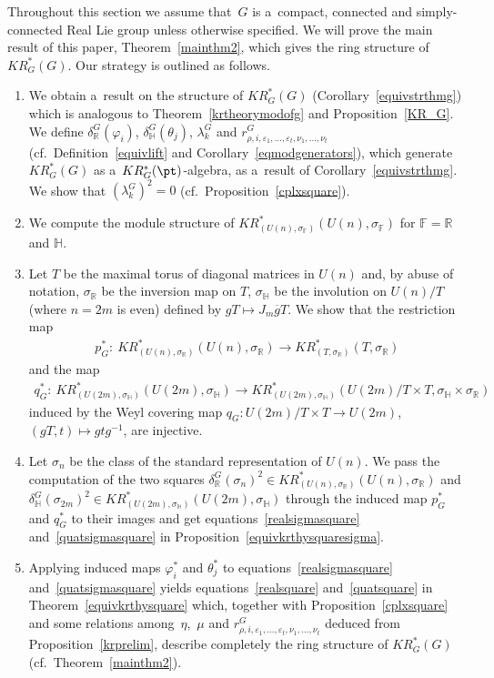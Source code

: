 Throughout this section we assume that~$G$ is a~compact, connected and simply-connected Real Lie group unless otherwise
specif\/ied.
We will prove the main result of this paper, Theorem~\ref{mainthm2}, which gives the ring structure of $KR_G^*(G)$.
Our strategy is outlined as follows.
\begin{enumerate}\itemsep=0pt
\item
We obtain a~result on the structure of $KR^*_G(G)$ (Corollary~\ref{equivstrthmg}) which is analogous to
Theorem~\ref{krtheorymodofg} and Proposition~\ref{KR_G}.
We def\/ine $\delta_\mathbb{R}^G(\varphi_i)$, $\delta_\mathbb{H}^G(\theta_j)$, $\lambda_k^G$ and $r^G_{\rho, i,
\varepsilon_1, \dots, \varepsilon_t, \nu_1, \dots, \nu_t}$ (cf.\ Def\/inition~\ref{equivlift} and
Corollary~\ref{eqmodgenerators}), which generate $KR_G^*(G)$ as a~$KR_G^*(\pt)$-algebra, as a~result of
Corollary~\ref{equivstrthmg}.
We show that $(\lambda_k^G)^2=0$ (cf.\ Proposition~\ref{cplxsquare}).
\item
We compute the module structure of $KR^*_{(U(n),
\sigma_\mathbb{F})}(U(n),
\sigma_\mathbb{F})$ for $\mathbb{F}=\mathbb{R}$ and $\mathbb{H}$.
\item
Let $T$ be the maximal torus of diagonal matrices in $U(n)$ and, by abuse of notation, $\sigma_\mathbb{R}$ be the inversion map on $T$, $\sigma_\mathbb{H}$ be the involution on $U(n)/T$ (where $n=2m$ is even) def\/ined by $gT\mapsto J_m\overline{g}T$.
We show that the restriction map
\begin{gather*}
p^*_G: \  KR^*_{(U(n),
\sigma_\mathbb{R})}(U(n),
\sigma_\mathbb{R})\to KR^*_{(T,
\sigma_\mathbb{R})}(T,
\sigma_\mathbb{R})
\end{gather*}
and the map
\begin{gather*}
q^*_G: \ KR^*_{(U(2m),
\sigma_\mathbb{H})}(U(2m),
\sigma_\mathbb{H})\to KR^*_{(U(2m),
\sigma_\mathbb{H})}(U(2m)/T\times T,
\sigma_\mathbb{H}
\times
\sigma_\mathbb{R})
\end{gather*}
induced by the Weyl covering map $q_G: U(2m)/T\times T\to U(2m)$, $(gT, t)\mapsto gtg^{-1}$, are injective.
\item
Let $\sigma_n$ be the class of the standard representation of $U(n)$.
We pass the computation of the two squares $\delta_\mathbb{R}^G(\sigma_n)^2\in KR^*_{(U(n), \sigma_\mathbb{R})}(U(n),
\sigma_\mathbb{R})$ and $\delta_\mathbb{H}^G(\sigma_{2m})^2\in KR^*_{(U(2m),
\sigma_\mathbb{H})}(U(2m),
\sigma_\mathbb{H})$ through the induced map $p^*_G$ and $q_G^*$ to their images and get equations~\eqref{realsigmasquare}
and~\eqref{quatsigmasquare} in Proposition~\ref{equivkrthysquaresigma}.
\item
Applying induced maps $\varphi_i^*$ and $\theta_j^*$ to equations~\eqref{realsigmasquare} and~\eqref{quatsigmasquare}
yields equations~\eqref{realsquare} and~\eqref{quatsquare} in Theorem~\ref{equivkrthysquare} which, together with
Proposition~\ref{cplxsquare} and some relations among~$\eta$,~$\mu$ and $r^G_{\rho, i, \varepsilon_1, \dots,
\varepsilon_t, \nu_1, \dots, \nu_t}$ deduced from Proposition~\ref{krprelim}, describe completely the ring structure of
$KR_G^*(G)$ (cf.\ Theorem~\ref{mainthm2}).
\end{enumerate}
